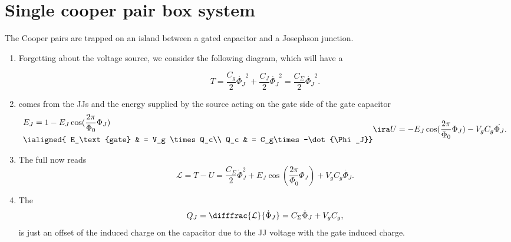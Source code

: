 \section{Single cooper pair box system\label{sec:cooper_pair_box}}
  The Cooper pairs are trapped on an island between a gated capacitor and a Josephson junction.
  


 
 \begin{enumerate}
 	\item Forgetting about the voltage source, we consider the following diagram, which will have a 
 	
 	\begin{equation}\label{key}
 		T = \frac{C_g}{2}\dot{\Phi_J}^2 + \frac{C_J}{2}\dot{\Phi_J}^2 = \frac{C_\Sigma}{2}\dot{\Phi_J}^2.
 	\end{equation}
 	
 	
 	\item \textbf{} comes from the JJs and the energy supplied by the source acting on the gate side of the gate capacitor 	
 	\begin{equation}\label{key}
 		\begin{aligned}
	 		& E_J = 1 - E_J\cos(\frac{2\pi}{\Phi_0}\Phi_J)\\
		 	& \ialigned{
		 		E_\text{gate} & = V_g \times Q_c\\
	 			Q_c & = C_g\times -\dot{\Phi_J}}
 		\end{aligned}\ira U = -E_J\cos(\frac{2\pi}{\Phi_0}\Phi_J) - V_gC_g\dot{\Phi_J}.
 	\end{equation}
 	
 	
 	\item The full  now reads
 	\begin{equation}\label{key}
 		\mathcal{L} = T - U = \frac{C_\Sigma}{2}\dot{\Phi}_J^2 + E_J\cos(\frac{2\pi}{\Phi_0}\Phi_J) + V_gC_g\dot{\Phi_J}.
 	\end{equation}
 	
 	\item The \textbf{}
 	\begin{equation}\label{key}
 		Q_J = \difffrac{\mathcal{L}}{\dot{\Phi}_J} = C_\Sigma\dot{\Phi}_J + V_gC_g,
 	\end{equation}
 	\noindent is just an offset of the induced charge on the capacitor due to the JJ voltage with the gate induced charge.
 	

\end{enumerate}
